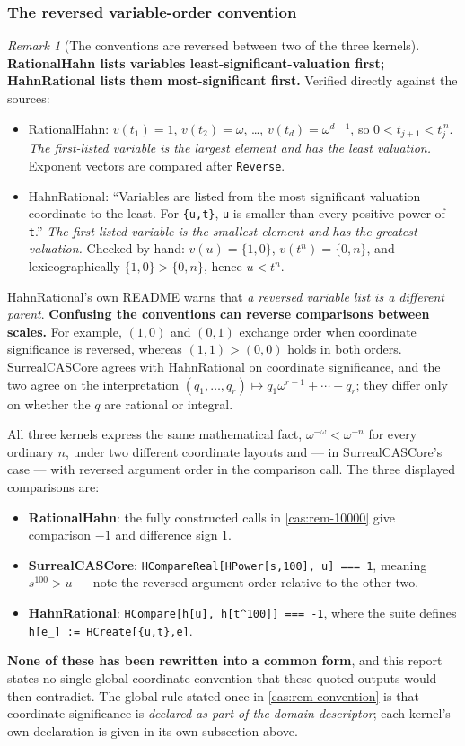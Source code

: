 \documentclass[11pt,letterpaper]{article}
\numberwithin{equation}{section}
\theoremstyle{definition}
\theoremstyle{remark}
\newtheorem{remark}[theorem]{Remark}
\begin{document}
\subsubsection{The reversed variable-order convention}
\label{cas:sub-orderconventions}
\begin{remark}[The conventions are reversed between two of the three kernels]
\label{cas:rem-reversal}
\textbf{RationalHahn lists variables least-significant-valuation first;
HahnRational lists them most-significant first.} Verified directly against the
sources:
\begin{itemize}
\item RationalHahn: $v(t_1)=1$, $v(t_2)=\omega$, \dots, $v(t_d)=\omega^{d-1}$,
so $0<t_{j+1}<t_j^{\,n}$. \emph{The first-listed variable is the largest element
and has the least valuation.} Exponent vectors are compared after
\texttt{Reverse}.
\item HahnRational: ``Variables are listed from the most significant valuation
coordinate to the least. For \texttt{\{u,t\}}, \texttt{u} is smaller than every
positive power of \texttt{t}.'' \emph{The first-listed variable is the smallest
element and has the greatest valuation.} Checked by hand: $v(u)=\{1,0\}$,
$v(t^n)=\{0,n\}$, and lexicographically $\{1,0\}>\{0,n\}$, hence $u<t^n$.
\end{itemize}
HahnRational's own README warns that \emph{a reversed variable list is a
different parent}. \textbf{Confusing the conventions can reverse comparisons
between scales.} For example, $(1,0)$ and $(0,1)$ exchange order when coordinate
significance is reversed, whereas $(1,1)>(0,0)$ holds in both orders.
SurrealCASCore agrees with HahnRational on
coordinate significance, and the two agree on the interpretation
$(q_1,\dots,q_r)\mapsto q_1\omega^{r-1}+\cdots+q_r$; they differ only on whether
the $q$ are rational or integral.
\end{remark}

All three kernels express the same mathematical fact,
$\omega^{-\omega}<\omega^{-n}$ for every ordinary $n$, under two different
coordinate layouts and --- in SurrealCASCore's case --- with reversed argument
order in the comparison call. The three displayed comparisons are:
\begin{itemize}
\item \textbf{RationalHahn}: the fully constructed calls in
\cref{cas:rem-10000} give comparison $-1$ and difference sign $1$.
\item \textbf{SurrealCASCore}: \texttt{HCompareReal[HPower[s,100], u] === 1},
meaning $s^{100}>u$ --- note the reversed argument order relative to the other
two.
\item \textbf{HahnRational}: \texttt{HCompare[h[u], h[t\^{}100]] === -1},
where the suite defines \texttt{h[e\_] := HCreate[\{u,t\},e]}.
\end{itemize}
\textbf{None of these has been rewritten into a common form}, and this report
states no single global coordinate convention that these quoted outputs would
then contradict. The global rule stated once in \cref{cas:rem-convention} is
that coordinate significance is \emph{declared as part of the domain
descriptor}; each kernel's own declaration is given in its own subsection above.
\end{document}
